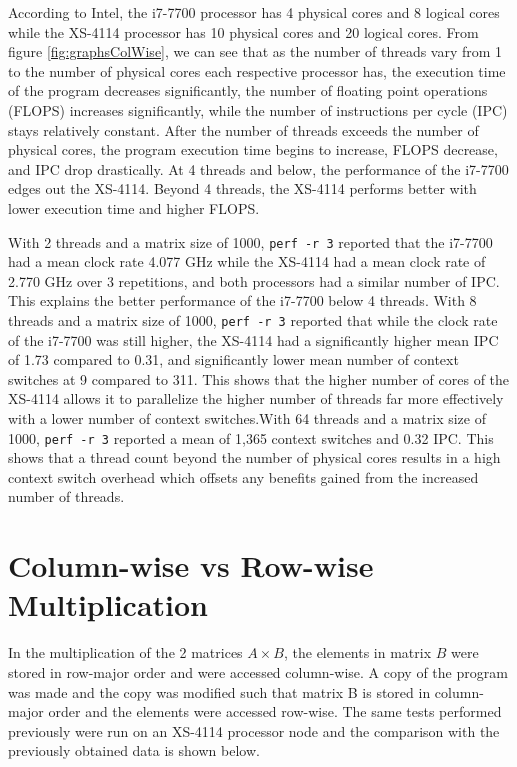 \documentclass{article}
\begin{document}
According to Intel, the i7-7700 processor has 4 physical cores and 8 logical cores while the XS-4114 processor has 10 physical cores and 20 logical cores. From figure \ref{fig:graphsColWise}, we can see that as the number of threads vary from 1 to the number of physical cores each respective processor has, the execution time of the program decreases significantly, the number of floating point operations (FLOPS) increases significantly, while the number of instructions per cycle (IPC) stays relatively constant. After the number of threads exceeds the number of physical cores, the program execution time begins to increase, FLOPS decrease, and IPC drop drastically. At 4 threads and below, the performance of the i7-7700 edges out the XS-4114. Beyond 4 threads, the XS-4114 performs better with lower execution time and higher FLOPS.

With 2 threads and a matrix size of 1000, \texttt{perf -r 3} reported that the i7-7700 had a mean clock rate 4.077 GHz while the XS-4114 had a mean clock rate of 2.770 GHz over 3 repetitions, and both processors had a similar number of IPC. This explains the better performance of the i7-7700 below 4 threads. With 8 threads and a matrix size of 1000, \texttt{perf -r 3} reported that while the clock rate of the i7-7700 was still higher, the XS-4114 had a significantly higher mean IPC of 1.73 compared to 0.31, and significantly lower mean number of context switches at 9 compared to 311. This shows that the higher number of cores of the XS-4114 allows it to parallelize the higher number of threads far more effectively with a lower number of context switches.With 64 threads and a matrix size of 1000, \texttt{perf -r 3} reported a mean of 1,365 context switches and 0.32 IPC. This shows that a thread count beyond the number of physical cores results in a high context switch overhead which offsets any benefits gained from the increased number of threads.

\section{Column-wise vs Row-wise Multiplication}
In the multiplication of the 2 matrices $A \times B$, the elements in matrix $B$ were stored in row-major order and were accessed column-wise. A copy of the program was made and the copy was modified such that matrix B is stored in column-major order and the elements were accessed row-wise. The same tests performed previously were run on an XS-4114 processor node and the comparison with the previously obtained data is shown below.  
\end{document}
